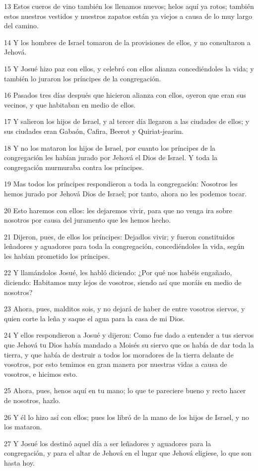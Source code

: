 \par 13 Estos cueros de vino también los llenamos nuevos; helos aquí ya rotos; también estos nuestros vestidos y nuestros zapatos están ya viejos a causa de lo muy largo del camino.
\par 14 Y los hombres de Israel tomaron de la provisiones de ellos, y no consultaron a Jehová.
\par 15 Y Josué hizo paz con ellos, y celebró con ellos alianza concediéndoles la vida; y también lo juraron los príncipes de la congregación.
\par 16 Pasados tres días después que hicieron alianza con ellos, oyeron que eran sus vecinos, y que habitaban en medio de ellos.
\par 17 Y salieron los hijos de Israel, y al tercer día llegaron a las ciudades de ellos; y sus ciudades eran Gabaón, Cafira, Beerot y Quiriat-jearim.
\par 18 Y no los mataron los hijos de Israel, por cuanto los príncipes de la congregación les habían jurado por Jehová el Dios de Israel. Y toda la congregación murmuraba contra los príncipes.
\par 19 Mas todos los príncipes respondieron a toda la congregación: Nosotros les hemos jurado por Jehová Dios de Israel; por tanto, ahora no les podemos tocar.
\par 20 Esto haremos con ellos: les dejaremos vivir, para que no venga ira sobre nosotros por causa del juramento que les hemos hecho.
\par 21 Dijeron, pues, de ellos los príncipes: Dejadlos vivir; y fueron constituidos leñadores y aguadores para toda la congregación, concediéndoles la vida, según les habían prometido los príncipes.
\par 22 Y llamándolos Josué, les habló diciendo: ¿Por qué nos habéis engañado, diciendo: Habitamos muy lejos de vosotros, siendo así que moráis en medio de nosotros?
\par 23 Ahora, pues, malditos sois, y no dejará de haber de entre vosotros siervos, y quien corte la leña y saque el agua para la casa de mi Dios.
\par 24 Y ellos respondieron a Josué y dijeron: Como fue dado a entender a tus siervos que Jehová tu Dios había mandado a Moisés su siervo que os había de dar toda la tierra, y que había de destruir a todos los moradores de la tierra delante de vosotros, por esto temimos en gran manera por nuestras vidas a causa de vosotros, e hicimos esto.
\par 25 Ahora, pues, henos aquí en tu mano; lo que te pareciere bueno y recto hacer de nosotros, hazlo.
\par 26 Y él lo hizo así con ellos; pues los libró de la mano de los hijos de Israel, y no los mataron.
\par 27 Y Josué los destinó aquel día a ser leñadores y aguadores para la congregación, y para el altar de Jehová en el lugar que Jehová eligiese, lo que son hasta hoy.

